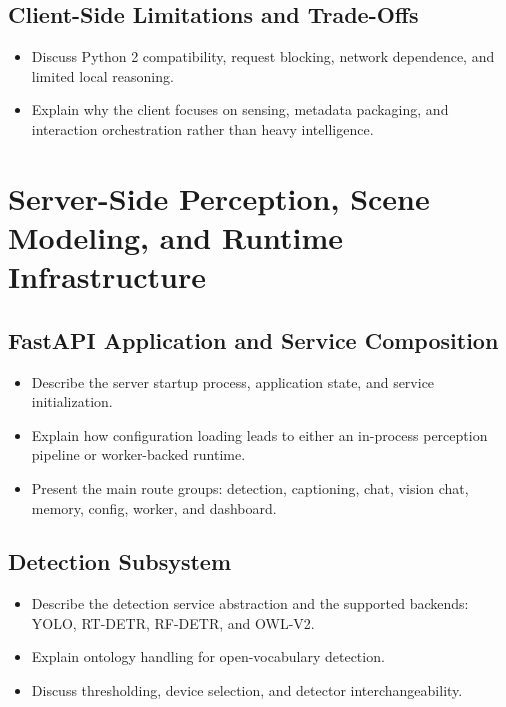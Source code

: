 \documentclass[
  digital,     %
  oneside,     %
  nosansbold,  %
  nocolorbold, %
  lof,         %
  lot,         %
]{fithesis4}
\begin{document}
\section{Client-Side Limitations and Trade-Offs}
\begin{itemize}
    \item Discuss Python 2 compatibility, request blocking, network dependence, and limited local reasoning.
    \item Explain why the client focuses on sensing, metadata packaging, and interaction orchestration rather than heavy intelligence.
\end{itemize}

\chapter{Server-Side Perception, Scene Modeling, and Runtime Infrastructure}

\section{FastAPI Application and Service Composition}
\begin{itemize}
    \item Describe the server startup process, application state, and service initialization.
    \item Explain how configuration loading leads to either an in-process perception pipeline or worker-backed runtime.
    \item Present the main route groups: detection, captioning, chat, vision chat, memory, config, worker, and dashboard.
\end{itemize}

\section{Detection Subsystem}
\begin{itemize}
    \item Describe the detection service abstraction and the supported backends: YOLO, RT-DETR, RF-DETR, and OWL-V2.
    \item Explain ontology handling for open-vocabulary detection.
    \item Discuss thresholding, device selection, and detector interchangeability.
\end{itemize}
\end{document}

